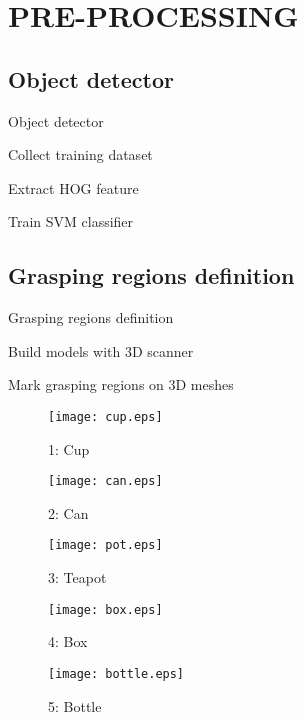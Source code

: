 \documentclass[xcolor=table,compress,blue]{beamer}
\begin{document}
\section{PRE-PROCESSING}
\subsection{Object detector}
\begin{frame}{Object detector}
	\begin{exampleblock}{Collect training dataset}

	\end{exampleblock}
	\begin{exampleblock}{Extract HOG feature}

	\end{exampleblock}
	\begin{exampleblock}{Train SVM classifier}

	\end{exampleblock}
\end{frame}
 
\subsection{Grasping regions definition}
\begin{frame}{Grasping regions definition}
	\begin{exampleblock}{Build models with 3D scanner}
		
	\end{exampleblock}
	\begin{exampleblock}{Mark grasping regions on 3D meshes}
		\begin{figure}[htpb]
			\centering
			\begin{minipage}[b]{0.8in}
				\centerline{\texttt{[image: cup.eps]}}
				\centerline{\small{1: Cup}}
			\end{minipage}
			\begin{minipage}[b]{0.8in}
				\centerline{\texttt{[image: can.eps]}}
				\centerline{\small{2: Can}}
			\end{minipage}
			\begin{minipage}[b]{0.8in}
				\centerline{\texttt{[image: pot.eps]}}
				\centerline{\small{3: Teapot}}
			\end{minipage}
			\begin{minipage}[b]{0.8in}
				\centerline{\texttt{[image: box.eps]}}
				\centerline{\small{4: Box}}
			\end{minipage}
			\begin{minipage}[b]{0.8in}
				\centerline{\texttt{[image: bottle.eps]}}
				\centerline{\small{5: Bottle}}
			\end{minipage}
			\label{fig:Models} %
		\end{figure}
	\end{exampleblock}
\end{frame}
\end{document}
